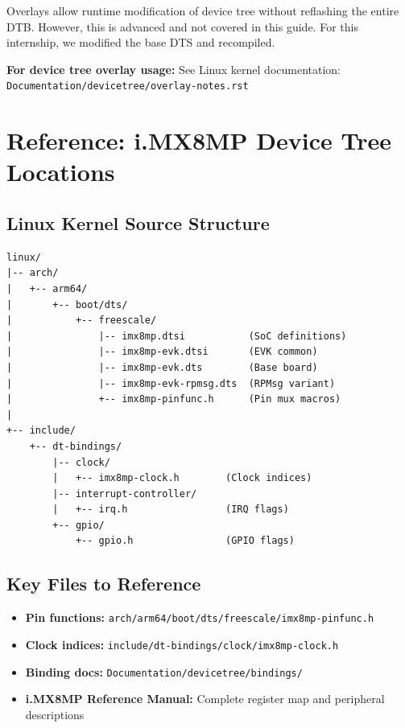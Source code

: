\documentclass[12pt,a4paper]{report}
\begin{document}
Overlays allow runtime modification of device tree without reflashing the entire DTB. However, this is advanced and not covered in this guide. For this internship, we modified the base DTS and recompiled.

\begin{docref}
\textbf{For device tree overlay usage:} See Linux kernel documentation:
\texttt{Documentation/devicetree/overlay-notes.rst}
\end{docref}

\section{Reference: i.MX8MP Device Tree Locations}

\subsection{Linux Kernel Source Structure}

\begin{verbatim}
linux/
|-- arch/
|   +-- arm64/
|       +-- boot/dts/
|           +-- freescale/
|               |-- imx8mp.dtsi           (SoC definitions)
|               |-- imx8mp-evk.dtsi       (EVK common)
|               |-- imx8mp-evk.dts        (Base board)
|               |-- imx8mp-evk-rpmsg.dts  (RPMsg variant)
|               +-- imx8mp-pinfunc.h      (Pin mux macros)
|
+-- include/
    +-- dt-bindings/
        |-- clock/
        |   +-- imx8mp-clock.h        (Clock indices)
        |-- interrupt-controller/
        |   +-- irq.h                 (IRQ flags)
        +-- gpio/
            +-- gpio.h                (GPIO flags)
\end{verbatim}

\subsection{Key Files to Reference}

\begin{itemize}
    \item \textbf{Pin functions:} \texttt{arch/arm64/boot/dts/freescale/imx8mp-pinfunc.h}
    \item \textbf{Clock indices:} \texttt{include/dt-bindings/clock/imx8mp-clock.h}
    \item \textbf{Binding docs:} \texttt{Documentation/devicetree/bindings/}
    \item \textbf{i.MX8MP Reference Manual:} Complete register map and peripheral descriptions
\end{itemize}
\end{document}
